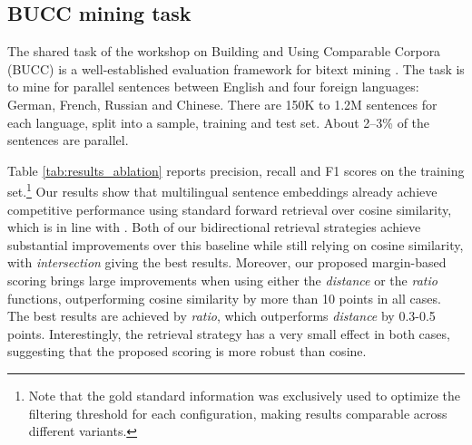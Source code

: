 \documentclass[11pt,a4paper]{article}
\begin{document}
\subsection{BUCC mining task} \label{subsec:bucc}

The shared task of the workshop on Building and Using Comparable Corpora (BUCC) is a well-established evaluation framework for bitext mining \citep{zweigenbaum2017overview,zweigenbaum2018overview}. The task is to mine for parallel sentences between English and four foreign languages: German, French, Russian and Chinese. There are 150K to 1.2M sentences for each language, split into a sample, training and test set. About 2--3\% of the sentences are parallel.

Table \ref{tab:results_ablation} reports precision, recall and F1 scores on the training set.\footnote{Note that the gold standard information was exclusively used to optimize the filtering threshold for each configuration, making results comparable across different variants.} Our results show that multilingual sentence embeddings already achieve competitive performance using standard forward retrieval over cosine similarity, which is in line with \citet{schwenk2018filtering}. Both of our bidirectional retrieval strategies achieve substantial improvements over this baseline while still relying on cosine similarity, with \textit{intersection} giving the best results.
Moreover, our proposed margin-based scoring brings large improvements when using either the \textit{distance} or the \textit{ratio} functions, outperforming cosine similarity by more than 10 points in all cases. The best results are achieved by \textit{ratio}, which outperforms \textit{distance} by 0.3-0.5 points. Interestingly, the retrieval strategy has a very small effect in both cases, suggesting that the proposed scoring is more robust than cosine.%
\end{document}
